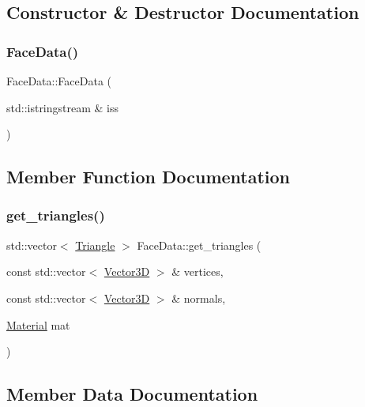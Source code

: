 \subsection{Constructor \& Destructor Documentation}
\mbox{\label{structFaceData_a551092a23b9870e60bb840e6079f786d}} 
\subsubsection{\texorpdfstring{FaceData()}{FaceData()}}
{\footnotesize\ttfamily Face\+Data\+::\+Face\+Data (\begin{DoxyParamCaption}\item[{std\+::istringstream \&}]{iss }\end{DoxyParamCaption})}



\subsection{Member Function Documentation}
\mbox{\label{structFaceData_a641796d91855ab809b4b56e563b53be2}} 
\subsubsection{\texorpdfstring{get\_triangles()}{get\_triangles()}}
{\footnotesize\ttfamily std\+::vector$<$ \mbox{\hyperlink{classTriangle}{Triangle}} $>$ Face\+Data\+::get\+\_\+triangles (\begin{DoxyParamCaption}\item[{const std\+::vector$<$ \mbox{\hyperlink{classVector3D}{Vector3D}} $>$ \&}]{vertices,  }\item[{const std\+::vector$<$ \mbox{\hyperlink{classVector3D}{Vector3D}} $>$ \&}]{normals,  }\item[{\mbox{\hyperlink{classMaterial}{Material}}}]{mat }\end{DoxyParamCaption})}



\subsection{Member Data Documentation}
\mbox{\label{structFaceData_adb2e792d840b92f060ea4c615a91b0c3}} 
